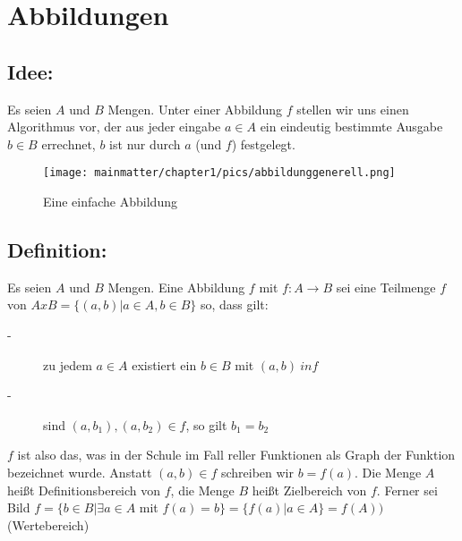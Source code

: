 \section{Abbildungen}

\subsection{Idee:}
Es seien $A$ und $B$ Mengen. Unter einer Abbildung $f$ stellen wir uns einen Algorithmus vor, der aus jeder eingabe $a \in A$ ein eindeutig bestimmte Ausgabe $b \in B$ errechnet, $b$ ist nur durch $a$ (und $f$) festgelegt.

\begin{figure} [H]
\centering 
\texttt{[image: mainmatter/chapter1/pics/abbildunggenerell.png]}
\caption{Eine einfache Abbildung} 
\end{figure}
%
%
%
\subsection{Definition:}

Es seien $A$ und $B$ Mengen. Eine Abbildung $f$ mit $ f:A \rightarrow B $ sei eine Teilmenge $f$ von $AxB = \{ (a,b) | a \in A, b \in B \}$ so, dass gilt:

\begin{description} 
\item[-] zu jedem $a \in A$ existiert ein $b \in B$ mit $(a,b) \ in f$ 
\item[-] sind $(a,b_{1}), (a,b_{2}) \in f$, so gilt $b_{1} = b_{2}$
\end{description}

$f$ ist also das, was in der Schule im Fall reller Funktionen als Graph der Funktion bezeichnet wurde. Anstatt $(a,b) \in f$ schreiben wir $b = f(a)$. Die Menge $A$ heißt Definitionsbereich von $f$, die Menge $B$ heißt Zielbereich von $f$. Ferner sei Bild $f = \{b \in B | \exists a \in A$ mit $f(a) = b\} = \{f(a) |  a \in A\} = f(A))$ (Wertebereich)
%
%
%
\newpage
